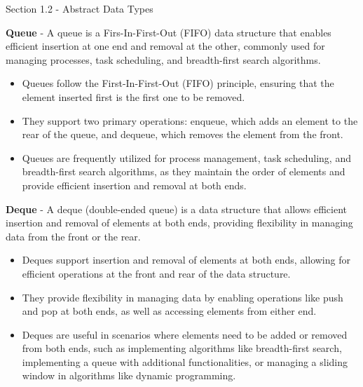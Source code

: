 \begin{notes}{Section 1.2 - Abstract Data Types}
    \begin{highlight}[Queue]
        \textbf{Queue} - A queue is a Firs-In-First-Out (FIFO) data structure that enables efficient insertion at one end and removal at the other, commonly used for managing
        processes, task scheduling, and breadth-first search algorithms.
        \begin{itemize}
            \item Queues follow the First-In-First-Out (FIFO) principle, ensuring that the element inserted first is the first one to be removed.
            \item They support two primary operations: enqueue, which adds an element to the rear of the queue, and dequeue, which removes the element from the front.
            \item Queues are frequently utilized for process management, task scheduling, and breadth-first search algorithms, as they maintain the order of elements and provide efficient
            insertion and removal at both ends.
        \end{itemize}
    \end{highlight}

    \begin{highlight}[Deque]
        \textbf{Deque} - A deque (double-ended queue) is a data structure that allows efficient insertion and removal of elements at both ends, providing flexibility in managing
        data from the front or the rear.
        \begin{itemize}
            \item Deques support insertion and removal of elements at both ends, allowing for efficient operations at the front and rear of the data structure.
            \item They provide flexibility in managing data by enabling operations like push and pop at both ends, as well as accessing elements from either end.
            \item Deques are useful in scenarios where elements need to be added or removed from both ends, such as implementing algorithms like breadth-first search, implementing a queue
            with additional functionalities, or managing a sliding window in algorithms like dynamic programming.
        \end{itemize}
    \end{highlight}


\end{notes}
